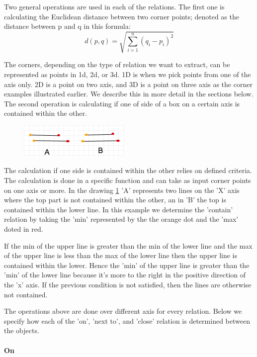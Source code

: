 Two general operations are used in each of the relations. The first one is calculating  the Euclidean distance between two corner points; denoted as the distance between p and q in this formula: 
\[
 d\left( p,q\right)   = \sqrt {\sum _{i=1}^{n}  \left( q_{i}-p_{i}\right)^2 } 
\]

The corners, depending on the type of relation we want to extract, can be represented as points in  1d, 2d, or 3d. 1D is  when we pick points from one of the axis only. 2D is a point on two axis, and 3D is a point on three axis as the corner examples illustrated earlier. We describe this in more detail in the sections below. The second operation is calculating if one of side of a box on a certain axis is contained within the other. 

\begin{figure}[H]
\centering
\includegraphics[scale=0.5]{images/contained.png}
\caption{}
\label{fig:contained}
\end{figure}

The calculation if one side is contained within the other relies on defined criteria. The calculation is done in a specific function and  can take as input  corner points on one axis or more. In the drawing \ref{fig:contained} 'A' represents two lines on the 'X' axis where the top part is not contained within the other, an in 'B' the top is contained within the lower line. In this example we determine the 'contain' relation by taking the 'min' represented by the the orange dot and the 'max' doted in red. 

If the min of the upper line is greater than the min of the lower line and the max of the upper line is less than the max of the lower line then the upper line is contained within the lower. Hence the 'min' of the upper line is greater than the 'min' of the lower line because it's more to the right in the positive direction of the 'x' axis. If the previous condition is not satisfied, then the lines are otherwise not contained. 


The operations above are done over different axis for every relation. Below we specify how each of the 'on', 'next to', and 'close' relation is determined between the objects. 

\paragraph{On}



